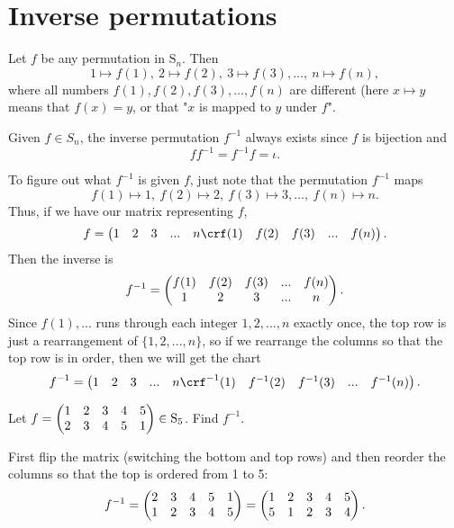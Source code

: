 \documentclass[11pt,dvipsnames]{book}
\numberwithin{figure}{section} %
\numberwithin{table}{section} %
\begin{document}
\section{Inverse permutations}

Let $f$ be any permutation in $\mathrm{S}_n$.  Then
$$
1\mapsto f(1),\  2\mapsto f(2),\  3\mapsto f(3),  \ldots,\  n\mapsto f(n),%
$$
where all numbers $f(1), f(2), f(3),\ldots, f(n)$ are different (here $x\mapsto y$ means that $f(x)=y$, or that "$x$ is mapped to $y$ under $f$".

Given $f\in S_{n}$, the inverse permutation $f^{-1}$ always exists since $f$ is bijection and
$$
f f^{-1}=f^{-1} f=\iota.
$$

To figure out what $f^{-1}$ is given $f$, just note that the permutation $f^{-1}$ maps
$$
f(1)\mapsto 1,\  f(2)\mapsto 2,\  f(3)\mapsto 3,  \ldots,\  f(n)\mapsto n.%
$$
Thus, if we have our matrix representing $f$, 
\[
f=\left(\begin{matrix} %
1 & 2 & 3 & ... & n\cr%
f(1) & f(2) & f(3) & ... & f(n)\cr%
\end{matrix}\right).
\]
Then the inverse is 
\[
f^{-1}=\left(\begin{matrix} %
f(1) & f(2) & f(3) & ... & f(n)\cr%
1 & 2 & 3 & ... & n\cr%
\end{matrix}\right).
\]
Since $f(1),...$ runs through each integer $1,2,...,n$ exactly once, the top row is just a rearrangement of $\{1,2,...,n\}$, so if we rearrange the columns so that the top row is in order, then we will get the chart
\[
f^{-1}=\left(\begin{matrix} %
1 & 2 & 3 & ... & n\cr%
f^{-1}(1) & f^{-1}(2) & f^{-1}(3) & ... & f^{-1}(n)\cr%
\end{matrix}\right).
\]

\begin{example}  Let $f=\left(\begin{matrix} %
1 & 2 & 3 & 4 & 5\cr%
2 & 3 & 4 & 5 & 1\cr%
\end{matrix}\right)\in\mathrm{S}_5$.   Find $f^{-1}$.

First flip the matrix (switching the bottom and top rows) and then reorder the columns so that the top is ordered from 1 to 5:
\[
f^{-1} = \left(\begin{matrix} %
2 & 3 & 4 & 5 & 1\cr%
1 & 2 & 3 & 4 & 5\cr%
\end{matrix}\right)
=\left(\begin{matrix} %
1 & 2 & 3 & 4 & 5\cr%
5 & 1 & 2 & 3 & 4\cr%
\end{matrix}\right).
\]
\end{example}
\end{document}
